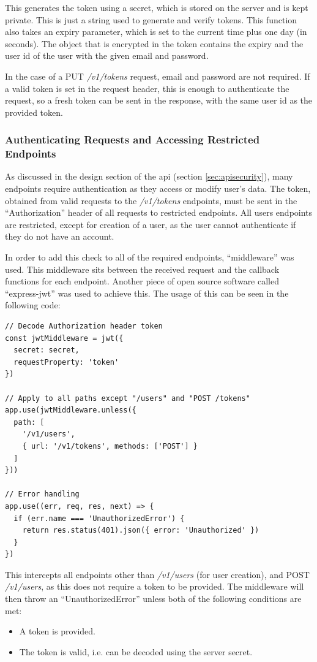 \documentclass[11pt,openright,a4paper]{report}
\begin{document}
This generates the token using a secret, which is stored on the server and is kept private. This is just a string used to generate and verify tokens. This function also takes an expiry parameter, which is set to the current time plus one day (in seconds). The object that is encrypted in the token contains the expiry and the user id of the user with the given email and password.

In the case of a PUT \emph{/v1/tokens} request, email and password are not required. If a valid token is set in the request header, this is enough to authenticate the request, so a fresh token can be sent in the response, with the same user id as the provided token.

\subsubsection{Authenticating Requests and Accessing Restricted Endpoints}
As discussed in the design section of the api (section \ref{sec:apisecurity}), many endpoints require authentication as they access or modify user's data. The token, obtained from valid requests to the \emph{/v1/tokens} endpoints, must be sent in the \enquote{Authorization} header of all requests to restricted endpoints. All users endpoints are restricted, except for creation of a user, as the user cannot authenticate if they do not have an account.

In order to add this check to all of the required endpoints, \enquote{middleware} was used. This middleware sits between the received request and the callback functions for each endpoint. Another piece of open source software called \enquote{express-jwt} \parencite{expressjwt} was used to achieve this. The usage of this can be seen in the following code:
\begin{lstlisting}
// Decode Authorization header token
const jwtMiddleware = jwt({
  secret: secret,
  requestProperty: 'token'
})

// Apply to all paths except "/users" and "POST /tokens"
app.use(jwtMiddleware.unless({
  path: [
    '/v1/users',
    { url: '/v1/tokens', methods: ['POST'] }
  ]
}))

// Error handling
app.use((err, req, res, next) => {
  if (err.name === 'UnauthorizedError') {
    return res.status(401).json({ error: 'Unauthorized' })
  }
})
\end{lstlisting}
This intercepts all endpoints other than \emph{/v1/users} (for user creation), and POST \emph{/v1/users}, as this does not require a token to be provided. The middleware will then throw an \enquote{UnauthorizedError} unless both of the following conditions are met:
\begin{itemize}
\item A token is provided.
\item The token is valid, i.e. can be decoded using the server secret.
\end{itemize}
\end{document}
